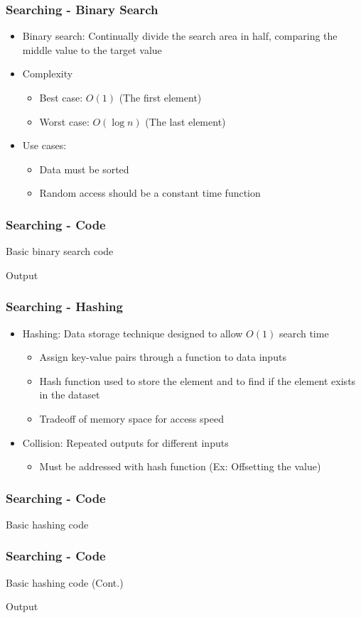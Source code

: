 \begin{frame}\frametitle{Searching - Binary Search}
\begin{itemize}
\item Binary search: Continually divide the search area in half, comparing the middle value to the target value
\item Complexity
	\begin{itemize}
	\item Best case: $O(1)$ (The first element)
	\item Worst case: $O(\log n)$ (The last element)
	\end{itemize}
\item Use cases:
	\begin{itemize}
	\item Data must be sorted
	\item Random access should be a constant time function
	\end{itemize}
\end{itemize}
\end{frame}

\begin{frame}\frametitle{Searching - Code}
Basic binary search code


Output

\end{frame}

\begin{frame}\frametitle{Searching - Hashing}
\begin{itemize}
\item Hashing: Data storage technique designed to allow $O(1)$ search time
	\begin{itemize}
	\item Assign key-value pairs through a function to data inputs
	\item Hash function used to store the element and to find if the element exists in the dataset
	\item Tradeoff of memory space for access speed
	\end{itemize}
\item Collision: Repeated outputs for different inputs
	\begin{itemize}
	\item Must be addressed with hash function (Ex: Offsetting the value)
	\end{itemize}
\end{itemize}
\end{frame}

\begin{frame}\frametitle{Searching - Code}
Basic hashing code

\end{frame}

\begin{frame}\frametitle{Searching - Code}
Basic hashing code (Cont.)

Output

\end{frame}
